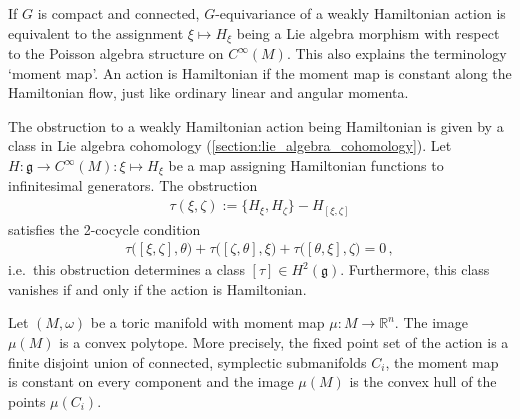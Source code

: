     \begin{property}[Obstruction]
        If $G$ is compact and connected, $G$-equivariance of a weakly Hamiltonian action is equivalent to the assignment $\xi\mapsto H_\xi$ being a Lie algebra morphism with respect to the Poisson algebra structure on $C^\infty(M)$. This also explains the terminology `moment map'. An action is Hamiltonian if the moment map is constant along the Hamiltonian flow, just like ordinary linear and angular momenta.

        The obstruction to a weakly Hamiltonian action being Hamiltonian is given by a class in Lie algebra cohomology (\cref{section:lie_algebra_cohomology}). Let $H:\mathfrak{g}\rightarrow C^\infty(M):\xi\mapsto H_\xi$ be a map assigning Hamiltonian functions to infinitesimal generators. The obstruction
        \begin{gather}
            \tau(\xi,\zeta) := \{H_\xi,H_\zeta\} - H_{[\xi,\zeta]}
        \end{gather}
        satisfies the 2-cocycle condition
        \begin{gather}
            \tau\bigl([\xi,\zeta],\theta\bigr) + \tau\bigl([\zeta,\theta],\xi\bigr) + \tau\bigl([\theta,\xi],\zeta\bigr) = 0\,,
        \end{gather}
        i.e.~this obstruction determines a class $[\tau]\in H^2(\mathfrak{g})$. Furthermore, this class vanishes if and only if the action is Hamiltonian.
    \end{property}

    \begin{theorem}
        Let $(M,\omega)$ be a toric manifold with moment map $\mu:M\rightarrow\mathbb{R}^n$. The image $\mu(M)$ is a convex polytope. More precisely, the fixed point set of the action is a finite disjoint union of connected, symplectic submanifolds $C_i$, the moment map is constant on every component and the image $\mu(M)$ is the convex hull of the points $\mu(C_i)$.
    \end{theorem}

